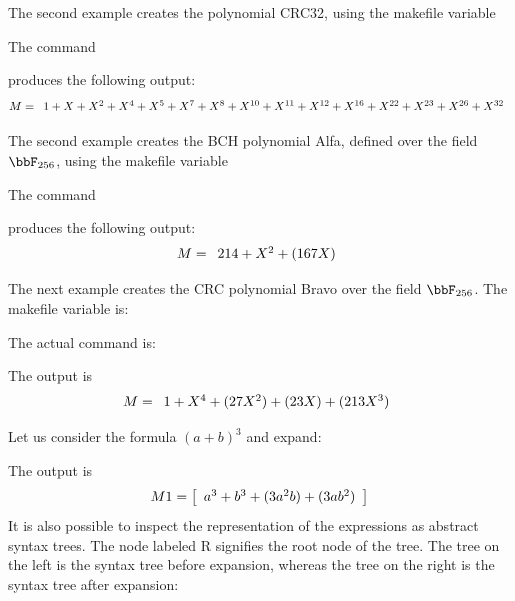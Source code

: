 \bigskip

The second example creates the polynomial CRC32, 
using the makefile variable


The command 



produces the following output:
$$
M = 
\begin{array}{*{1}c}
1 + X + X^{2} + X^{4} + X^{5} + X^{7} + X^{8} + X^{10} + X^{11} + X^{12} + X^{16} + X^{22} + X^{23} + X^{26} + X^{32}\\
\end{array}
$$



\bigskip


The second example creates the BCH polynomial Alfa, 
defined over the field $\bbF_{256}$, 
using the makefile variable


The command 



produces the following output:
$$
M = 
\begin{array}{*{1}c}
214 + X^{2} + (167 X)\\
\end{array}
$$



\bigskip



The next example creates the CRC polynomial Bravo over the field $\bbF_{256}$.
The makefile variable is:


The actual command is:


The output is 
$$
M = 
\begin{array}{*{1}c}
1 + X^{4} + (27 X^{2}) + (23 X) + (213 X^{3})\\
\end{array}
$$

\bigskip




Let us consider the formula $(a+b)^3$ and expand:




The output is 
$$
M1 = 
\left[
\begin{array}{*{1}c}
a^{3} + b^{3} + (3 a^{2} b) + (3 a b^{2})\\
\end{array}
\right]
$$
It is also possible to inspect the 
representation of the expressions as abstract syntax trees. 
The node labeled R signifies the root node of the tree. 
The tree on the left is the syntax tree before expansion, 
whereas the tree on the right is the syntax tree after expansion:

